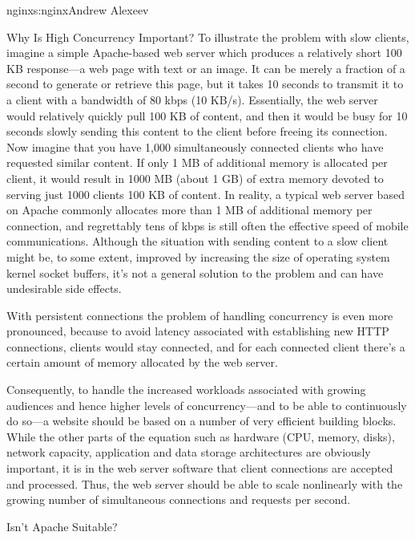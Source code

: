 \begin{aosachapter}{nginx}{s:nginx}{Andrew Alexeev}
\begin{aosasect1}{Why Is High Concurrency Important?}
To illustrate the problem with slow clients, imagine a simple
Apache-based web server which produces a relatively short 100 KB
response---a web page with text or an image. It can be merely a
fraction of a second to generate or retrieve this page, but it takes
10 seconds to transmit it to a client with a bandwidth of 80 kbps (10
KB/s). Essentially, the web server would relatively quickly pull 100
KB of content, and then it would be busy for 10 seconds slowly sending
this content to the client before freeing its connection. Now imagine
that you have 1,000 simultaneously connected clients who have
requested similar content. If only 1 MB of additional memory is
allocated per client, it would result in 1000 MB (about 1 GB) of
extra memory devoted to serving just 1000 clients 100 KB of
content. In reality, a typical web server based on Apache commonly
allocates more than 1 MB of additional memory per connection, and
regrettably tens of kbps is still often the effective speed of mobile
communications. Although the situation with sending content to a slow
client might be, to some extent, improved by increasing the size of
operating system kernel socket buffers, it's not a general solution to
the problem and can have undesirable side effects.

With persistent connections the problem of handling concurrency is
even more pronounced, because to avoid latency associated with
establishing new HTTP connections, clients would stay connected, and
for each connected client there's a certain amount of memory allocated
by the web server.

Consequently, to handle the increased workloads associated with
growing audiences and hence higher levels of concurrency---and to be
able to continuously do so---a website should be based on a number of
very efficient building blocks. While the other parts of the equation
such as hardware (CPU, memory, disks), network capacity, application
and data storage architectures are obviously important, it is in the
web server software that client connections are accepted and
processed. Thus, the web server should be able to scale nonlinearly
with the growing number of simultaneous connections and requests per
second.

\begin{aosasect2}{Isn't Apache Suitable?}


\end{aosasect2}
\end{aosasect1}
\end{aosachapter}

